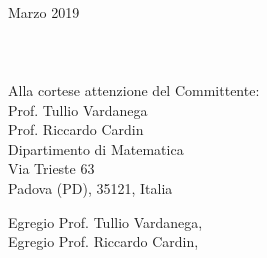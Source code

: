 \documentclass[11pt, a4paper]{letter} %
\begin{document}
	
	
	\begin{letter}{
			\-\\ Marzo 2019	
			\-\\\-\\\-\\\-\\
			Alla cortese attenzione del Committente:	\\
			Prof. Tullio Vardanega\\
			Prof. Riccardo Cardin\\	
			Dipartimento di Matematica\\ 
			Via Trieste 63\\ 
			Padova (PD), 35121, Italia
		}
		
		
		\opening{Egregio Prof.  Tullio Vardanega,\\
			Egregio Prof.  Riccardo Cardin,\\}
		

\end{letter}
\end{document}
